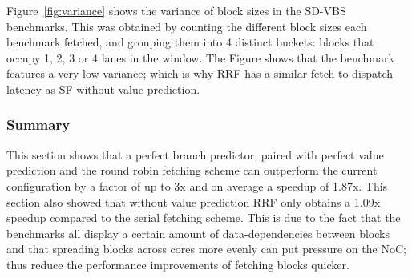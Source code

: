 Figure~\ref{fig:variance} shows the variance of block sizes in the SD-VBS benchmarks.
This was obtained by counting the different block sizes each benchmark fetched, and grouping them into 4 distinct buckets: blocks that occupy 1, 2, 3 or 4 lanes in the window.
The Figure shows that the benchmark  features a very low variance; which is why RRF has a similar fetch to dispatch latency as SF without value prediction.




\subsubsection{Summary}

This section shows that a perfect branch predictor, paired with perfect value prediction and the round robin fetching scheme can outperform the current configuration by a factor of up to 3x and on average a speedup of 1.87x.%
This section also showed that without value prediction RRF only obtains a 1.09x speedup compared to the serial fetching scheme.
This is due to the fact that the benchmarks all display a certain amount of data-dependencies between blocks and that spreading blocks across cores more evenly can put pressure on the NoC; thus reduce the performance improvements of fetching blocks quicker.

